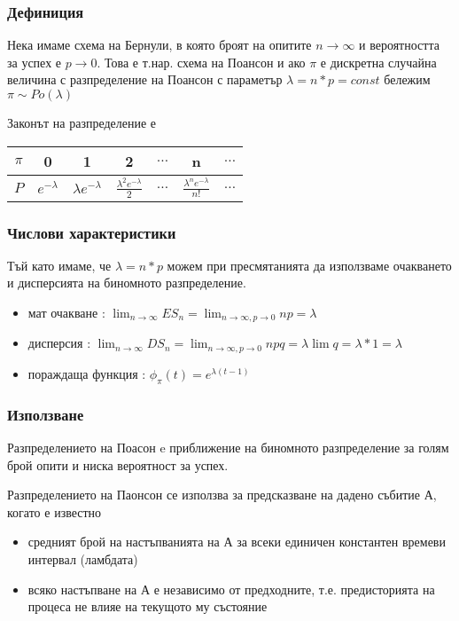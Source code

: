 \documentclass[fleqn,12pt]{article}
\begin{document}
\begin{justify}
\subsubsection{Дефиниция}
Нека имаме схема на Бернули, в която броят на опитите $n \rightarrow \infty$ и вероятността за успех е 
$p \rightarrow 0$. Това е т.нар. схема на Поансон и ако $\pi$ е дискретна случайна величина с разпределение на 
Поансон с параметър $\lambda = n*p = const$ бележим $\pi \sim Po(\lambda)$

Законът на разпределение е

\begin{tabular}{|c|c|c|c|c|c|c|}
    \hline
    $\pi$ & 0 & 1 & 2 & $\dots$ & n & $\dots$ \\
    \hline
    $P$ & $e^{-\lambda}$ & $\lambda e^{-\lambda}$ & $\frac{\lambda^2 e^{-\lambda}}{2}$ & $\dots$ & $\frac{\lambda^n
    e^{-\lambda}}{n!}$& $\dots$ \\
    \hline
\end{tabular}

\subsubsection{Числови характеристики} 
Тъй като имаме, че $\lambda = n*p$ можем при пресмятанията да използваме очакването и дисперсията на биномното 
разпределение. 
\begin{itemize}
    \item мат очакване : $\lim_{n \rightarrow \infty} ES_n = \lim_{n \rightarrow \infty, p \rightarrow 0} np = \lambda$
    \item дисперсия : $\lim_{n \rightarrow \infty} DS_n = \lim_{n \rightarrow \infty, p \rightarrow 0} npq = \lambda
    \lim q = \lambda * 1 = \lambda$
    \item пораждаща функция : $\phi_\pi(t) = e^{\lambda(t-1)}$
\end{itemize}
\subsubsection{Използване} 
Разпределението на Поасон e приближение на биномното разпределение за голям брой опити и ниска вероятност за успех.

Разпределението на Паонсон се използва за предсказване на дадено събитие А, когато е известно
\begin{itemize}
    \item средният брой на настъпванията на А за всеки единичен константен времеви интервал (ламбдата)
    \item всяко настъпване на А е независимо от предходните, т.е. предисторията на процеса не влияе на текущото му 
    състояние
\end{itemize}


\end{justify}
\end{document}
